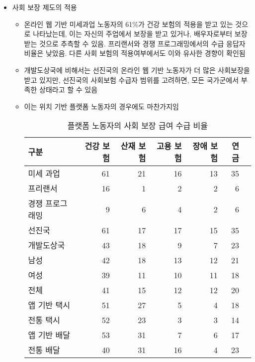 \begin{itemize}
\begin{itemize}
	\item 사회 보장 제도의 적용
		\begin{itemize}
		\item 온라인 웹 기반 미세과업 노동자의 61\%가 건강 보험의 적용을 받고 있는 것으로 나타났는데, 이는 자신의 주업에서 보장을 받고 있거나, 배우자로부터 보장 받는 것으로 추측할 수 있음. 프리랜서와 경쟁 프로그래밍에서의 수급 응답자 비율은 낮았음. 다른 사회 보험의 적용여부에서도 이와 유사한 경향이 확인됨
		\item 개발도상국에 비해서는 선진국의 온라인 웹 기반 노동자가 더 많은 사회보장을 받고 있지만, 선진국의 사회보험 수급자 범위를 고려하면, 모든 국가군에서 부족한 상태라고 할 수 있음
		\item 이는 위치 기반 플랫폼 노동자의 경우에도 마찬가지임
		
			\begin{table}[htp]
			\begin{center}
			\begin{threeparttable}
			\caption{플랫폼 노동자의 사회 보장 급여 수급 비율}\label{tab:ILO2021socialprotection}
			\begin{tabularx}{\textwidth}{lrrrrrr}
			\toprule
			 구분 & 건강 보험 & 산재 보험 & 고용 보험 & 장애 보험 & 연금 \\
			\midrule
			미세 과업 & 61 & 21 & 16 & 13 & 35 \\
			프리랜서 & 16 & 1 & 2 & 2 & 6 \\
			경쟁 프로그래밍 & 9 & 6 & 4 & 2 & 6 \\
			\midrule 
			선진국 & 61 & 17 & 17 & 15 & 35 \\
			개발도상국 & 43 & 18 & 9 & 7 & 23 \\
			\midrule
			남성 & 42 & 18 & 13 & 12 & 21 \\
			여성 & 39 & 11 & 10& 11 & 18 \\
			\midrule
			전체 & 41 &  15 & 12 & 12 & 20 \\
			\bottomrule
			앱 기반 택시 & 51 & 27 & 5 & 4 & 18 \\
			전통 택시 & 52 & 23 & 3 & 3& 14 \\
			\midrule
			앱 기반 배달 & 53 & 31 & 7 & 6 & 17 \\
			전통 배달 & 40 & 31 & 16 & 4 & 23 \\
			\bottomrule
			\end{tabularx}
			\begin{tablenotes}
			\small
			\item 단위: \%
			\end{tablenotes}
			\end{threeparttable}
			\end{center}
			\end{table}%
		

\end{itemize}
\end{itemize}
\end{itemize}
